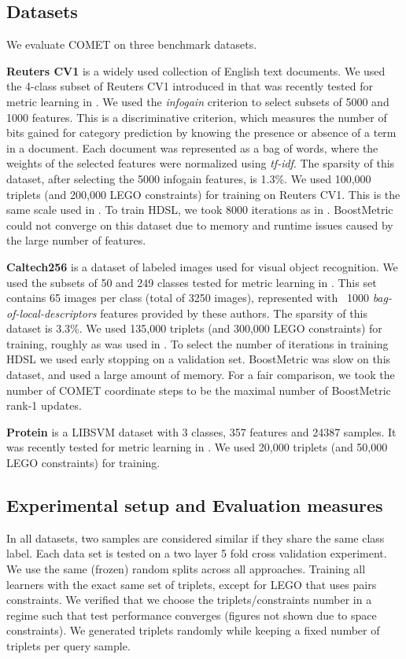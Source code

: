 \documentclass[twoside,11pt]{article}
\begin{document}
\subsection{Datasets}
We evaluate COMET on three benchmark datasets.

\textbf{Reuters CV1} is a widely used collection of English text documents. We used the 4-class subset of Reuters CV1 introduced in \citep{CaiRCV14} that was recently tested for metric learning in \citep{hdsl}. We used the \textit{infogain} criterion \citep{infogain} to select subsets of 5000 and 1000 features. This is a discriminative criterion, which measures the number of bits gained for category prediction by knowing the presence or absence of a term in a document. Each document was represented as a bag of words, where the weights of the selected features were normalized using \textit{tf-idf}. The sparsity of this dataset, after selecting the 5000 infogain features, is 1.3\%. We used 100,000 triplets (and 200,000 LEGO constraints) for training on Reuters CV1. This is the same scale used in \citet{hdsl}. To train HDSL, we took 8000 iterations as in \citep{hdsl}. BoostMetric could not converge on this dataset due to memory and runtime issues caused by the large number of features.

\newline
\textbf{Caltech256} is a dataset of labeled images used for visual object recognition. We used the subsets of 50 and 249 classes tested for metric learning in \citep{OASIS}. This set contains 65 images per class (total of 3250 images), represented with ~1000 \textit{bag-of-local-descriptors} features provided by these authors. The sparsity of this dataset is 3.3\%. We used 135,000 triplets (and 300,000 LEGO constraints) for training, roughly as was used in \citep{OASIS}. To select the number of iterations in training HDSL we used early stopping on a validation set. BoostMetric was slow on this dataset, and used a large amount of memory. For a fair comparison, we took the number of COMET coordinate steps to be the maximal number of BoostMetric rank-1 updates.

\newline
\textbf{Protein} is a LIBSVM \citep{libsvm} dataset with 3 classes, 357 features and 24387 samples. It was recently tested for metric learning in \citep{qian}. We used 20,000 triplets (and 50,000 LEGO constraints) for training.

\subsection{Experimental setup and Evaluation measures}
In all datasets, two samples are considered similar if they share the same class label. Each data set is tested on a two layer 5 fold cross validation experiment. We use the same (frozen) random splits across all approaches. Training all learners with the exact same set of triplets, except for LEGO that uses pairs constraints. We verified that we choose the triplets/constraints number in a regime such that test performance converges (figures not shown due to space constraints). We generated triplets randomly while keeping a fixed number of triplets per query sample.
\end{document}

